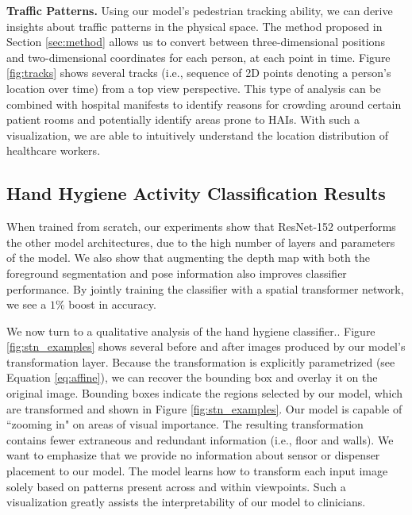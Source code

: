 \documentclass[twoside,11pt]{article}
\begin{document}
\textbf{Traffic Patterns.} Using our model's pedestrian tracking ability, we can derive insights about traffic patterns in the physical space.
The method proposed in Section \ref{sec:method} allows us to convert between three-dimensional positions and two-dimensional coordinates for each person, at each point in time.
Figure \ref{fig:tracks} shows several tracks (i.e., sequence of 2D points denoting a person's location over time) from a top view perspective.
This type of analysis can be combined with hospital manifests to identify reasons for crowding around certain patient rooms and potentially identify areas prone to HAIs.
With such a visualization, we are able to intuitively understand the location distribution of healthcare workers.

\subsection{Hand Hygiene Activity Classification Results}

When trained from scratch, our experiments show that ResNet-152 outperforms the other model architectures, due to the high number of layers and parameters of the model.
We also show that augmenting the depth map with both the foreground segmentation and pose information also improves classifier performance.
By jointly training the classifier with a spatial transformer network, we see a $1\%$ boost in accuracy.

We now turn to a qualitative analysis of the hand hygiene classifier..
Figure \ref{fig:stn_examples} shows several before and after images produced by our model's transformation layer.
Because the transformation is explicitly parametrized (see Equation \ref{eq:affine}), we can recover the bounding box and overlay it on the original image.
Bounding boxes indicate the regions selected by our model, which are transformed and shown in Figure \ref{fig:stn_examples}.
Our model is capable of ``zooming in" on areas of visual importance.
The resulting transformation contains fewer extraneous and redundant information (i.e., floor and walls).
We want to emphasize that we provide no information about sensor or dispenser placement to our model.
The model learns how to transform each input image solely based on patterns present across and within viewpoints.
Such a visualization greatly assists the interpretability of our model to clinicians.
\end{document}
